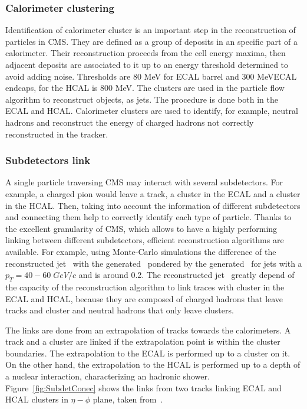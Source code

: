 \subsubsection{Calorimeter clustering}

Identification of calorimeter cluster is an important step in the reconstruction of particles in CMS. They are defined as a group of deposits in an specific part of a calorimeter. Their reconstruction proceeds from the cell energy maxima, then adjacent deposits are associated to it up to an energy threshold determined to avoid adding noise. Thresholds are 80 MeV for ECAL barrel and 300 MeVECAL endcaps, for the HCAL is 800 MeV. The clusters are used in the particle flow algorithm to reconstruct objects, as jets. The procedure is done both in the ECAL and HCAL. Calorimeter clusters are used to identify, for example, neutral hadrons and reconstruct the energy of charged hadrons not correctly reconstructed in the tracker.    

\subsubsection{Subdetectors link}

A single particle traversing CMS may interact with several subdetectors. For example, a charged pion would leave a track, a cluster in the ECAL and a cluster in the HCAL. Then, taking into account the information of different subdetectors and connecting them help to correctly identify each type of particle. Thanks to the excellent granularity of CMS, which allows to have a highly performing linking between different subdetectors, efficient reconstruction algorithms are available. For example, using Monte-Carlo simulations the difference of the reconstructed jet \pt~with the generated \pt~pondered by the generated \pt~for jets with a ${p_{T}=40-60\;GeV/c}$ and  is around 0.2. The reconstructed jet \pt~greatly depend of the capacity of the reconstruction algorithm to link traces with cluster in the ECAL and HCAL, because they are composed of charged hadrons that leave tracks and cluster and neutral hadrons that only leave clusters.

The links are done from an extrapolation of tracks towards the calorimeters. A track and a cluster are linked if the extrapolation point is within the cluster boundaries. The extrapolation to the ECAL is performed up to a cluster on it. On the other hand, the extrapolation to the HCAL is performed up to a  depth of a nuclear interaction, characterizing an hadronic shower. Figure~\ref{fig:SubdetConec} shows the links from two tracks linking ECAL and HCAL clusters in $\eta-\phi$ plane, taken from~\cite{Brochet:1956723}. %

